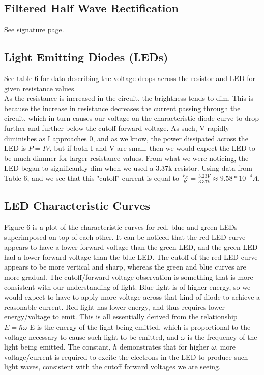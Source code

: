 \documentclass{article}
\begin{document}
\subsection{Filtered Half Wave Rectification}
    See signature page.
    
\subsection{Light Emitting Diodes (LEDs)}
    See table 6 for data describing the voltage drops across the resistor and LED for given resistance values.\\\indent As the resistance is increased in the circuit, the brightness tends to dim. This is because the increase in resistance decreases the current passing through the circuit, which in turn causes our voltage on the characteristic diode curve to drop further and further below the cutoff forward voltage. As such, V rapidly diminishes as I approaches 0, and as we know, the power dissipated across the LED is $P = IV$, but if both I and V are small, then we would expect the LED to be much dimmer for larger resistance values. From what we were noticing, the LED began to significantly dim when we used a 3.37k resistor. Using data from Table 6, and we see that this "cutoff" current is equal to $\frac{V_R}{R} = \frac{3.23V}{3.37k} \approx 9.58*10^{-4}A$.
\subsection{LED Characteristic Curves}
    Figure 6 is a plot of the characteristic curves for red, blue and green LEDs superimposed on top of each other. It can be noticed that the red LED curve appears to have a lower forward voltage than the green LED, and the green LED had a lower forward voltage than the blue LED. The cutoff of the red LED curve appears to be more vertical and sharp, whereas the green and blue curves are more gradual. The cutoff/forward voltage observation is something that is more consistent with our understanding of light. Blue light is of higher energy, so we would expect to have to apply more voltage across that kind of diode to achieve a reasonable current. Red light has lower energy, and thus requires lower energy/voltage to emit. This is all essentially derived from the relationship $E = \hbar \omega$ E is the energy of the light being emitted, which is proportional to the voltage necessary to cause such light to be emitted, and $\omega$ is the frequency of the light being emitted. The constant, $\hbar$ demonstrates that for higher $\omega$, more voltage/current is required to excite the electrons in the LED to produce such light waves, consistent with the cutoff forward voltages we are seeing.
\end{document}
